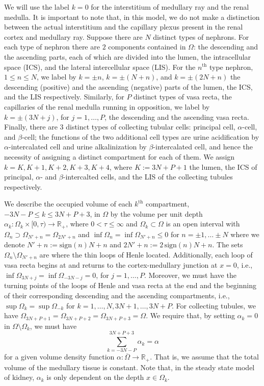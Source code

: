 \documentclass{article}
\begin{document}
We will use the label
$k=0$ for the interstitium of medullary ray and the renal medulla.
It is important to note that, in this model, we do not make a distinction between the actual interstitium and the capillary plexus present in the renal cortex and medullary ray.
Suppose there are $N$ distinct types of nephrons.
For each type of nephron there are $2$ components contained in $\Omega$: the descending and the ascending parts, each of which are divided into the lumen, the intracellular space (ICS), and the lateral intercellular space (LIS).
For the $n^{\mathrm{th}}$ type nephron, $1\leq n\leq N$, we label by $k=\pm n$, $k=\pm(N+n)$, and $k=\pm(2N+n)$ the descending (positive) and the ascending (negative) parts of the lumen, the ICS, and the LIS respectively.
Similarly, for $P$ distinct types of vasa recta, the capillaries of the renal medulla running in opposition, we label by $k=\pm(3N+j)$, for $j=1,\dots,P$, the descending and the ascending vasa recta.
Finally, there are 3 distinct types of collecting tubular cells: principal cell, $\alpha$-cell, and $\beta$-cell; the functions of the two additional cell types are urine acidification by $\alpha$-intercalated cell and urine alkalinization by $\beta$-intercalated cell, and hence the necessity of assigning a distinct compartment for each of them.
We assign $k=K,K+1,K+2,K+3,K+4$, where $K:=3N+P+1$ the lumen, the ICS of principal, $\alpha$- and $\beta$-intercalted cells, and the LIS of the collecting tubules respectively.

We describe the occupied volume of each $k^{\mathrm{th}}$ compartment, $-3N-P\leq k\leq 3N+P+3$, in $\Omega$ by the volume per unit depth $\alpha_k:\Omega_k\times [0,\tau)\to \mathbb{R}_+$, where $0<\tau\leq \infty$ and $\Omega_k\subset\Omega$ is an open interval with $\Omega_{n} \supset \Omega_{N'+n} = \Omega_{2N'+n}$ and $\inf\Omega_n = \inf\Omega_{N'+n}\leq 0$ for $n=\pm 1,\dots\pm N$ where we denote $N'+n := \mathrm{sign}(n)N+n$ and $2N'+n := 2\, \mathrm{sign}(n)N+n$.
The sets $\Omega_n\setminus \Omega_{N'+n}$ are where the thin loops of Henle located.
Additionally, each loop of vasa recta begins at and returns to the cortex-medullary junction at $x=0$, i.e., $\inf \Omega_{3N+j} = \inf \Omega_{-3N-j}=0$, for $j=1,\dots,P$.
Moreover, we must have the turning points of the loops of Henle and vasa recta at the end and the beginning of their corresponding descending and the ascending compartments, i.e., $\sup\Omega_k = \sup\Omega_{-k}$ for $k=1,\dots,N,3N+1,\dots,3N+P$.
For collecting tubules, we have $\Omega_{3N+P+1}=\Omega_{3N+P+2}=\Omega_{3N+P+3}=\Omega$.
We require that, by setting $\alpha_k=0$ in $\Omega\setminus\Omega_k$, we must have
\begin{equation}\label{eq:const_vol}
    \sum_{k=-3N-P}^{3N+P+3} \alpha_k = \alpha
\end{equation}
    for a given volume density function $\alpha:\overline{\Omega}\to\mathbb{R}_+$.
That is, we assume that the total volume of the medullary tissue is constant.
Note that, in the steady state model of kidney, $\alpha_k$ is only dependent on the depth $x\in \Omega_k$.
\end{document}
